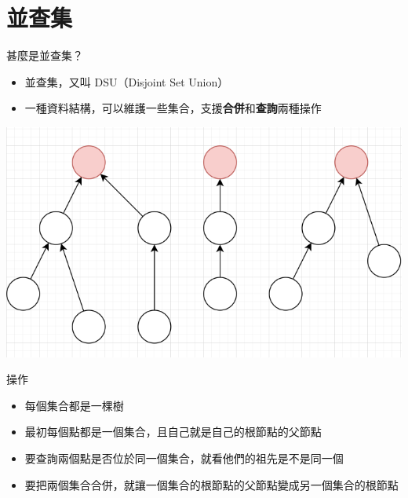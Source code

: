 \documentclass[aspectratio=169]{beamer}
\begin{document}
    \section{並查集}
    \begin{frame}{甚麼是並查集？}
        \begin{itemize}
            \item 並查集，又叫 DSU（Disjoint Set Union）
            \item 一種資料結構，可以維護一些集合，支援\textbf{合併}和\textbf{查詢}兩種操作
        \end{itemize}
        \begin{center}
            \includegraphics[scale=0.5]{images/dsu.png}
        \end{center}
    \end{frame}
    \begin{frame}{操作}
        \begin{itemize}
            \item 每個集合都是一棵樹
            \item<2-> 最初每個點都是一個集合，且自己就是自己的根節點的父節點
            \item<3-> 要查詢兩個點是否位於同一個集合，就看他們的祖先是不是同一個
            \item<4-> 要把兩個集合合併，就讓一個集合的根節點的父節點變成另一個集合的根節點
        \end{itemize}
    \end{frame}
\end{document}
